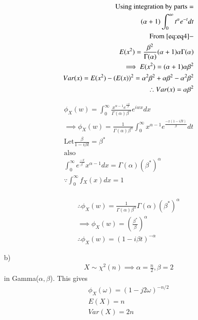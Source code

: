 \documentclass{beamer}
\begin{document}
 \begin{frame}
 \begin{align}
 \text{Using integration by parts}=\\
 (\alpha+1)\int_{0}^{\infty}t^{\alpha}e^{-t}dt\\
 \text{From \eqref{eq:eq4}}-\\
 E(x^2)=\frac{\beta^{2}}{\Gamma(\alpha)}(\alpha+1) \alpha \Gamma(\alpha)\\
 \implies E(x^2)=(\alpha+1) \alpha  \beta^{2}\\
 Var(x)= E(x^2)-(E(x))^2=\alpha^{2} \beta^{2}+\alpha\beta^{2}-\alpha^{2} \beta^{2}\\
 \therefore Var(x)=\alpha\beta^{2}
 \end{align}
 \end{frame}
 \begin{frame}
 \begin{align}
 \phi_{X}(w)=\int_{0}^{\infty} \frac{x^{\alpha-1}e^{\frac{-x}{\beta}}}{\Gamma(\alpha) \beta^{\alpha}} e^{iwx} dx \\
 \implies \phi_{X}(w)=\frac{1}{\Gamma(\alpha) \beta^{\alpha}} \int_{0}^{\infty}x^{\alpha-1} e^{\frac{-x(1-i\beta t)}{\beta}} dt\\
 \text{Let}\frac{\beta}{1-i \beta t}=\beta ^{*}\\
 \text{also} \\
 \int_{0}^{\infty} e^{\frac{-x}{\beta^{*}}} x^{\alpha-1} dx =\Gamma(\alpha)({\beta^{*}})^{\alpha}\\
 \because \int_{0}^{\infty}f_{X}(x)dx=1 \\
 \end{align}
 \end{frame}
 \begin{frame}
 \begin{align}
 \therefore \phi_{X}(w)=\frac{1}{\Gamma(\alpha) \beta^{\alpha}} \Gamma(\alpha)({\beta^{*}})^{\alpha}\\
 \implies \phi_{X}(w)=(\frac{\beta^{*}}{\beta})^{\alpha}\\
 \therefore \phi_{X}(w)=(1-i\beta t)^{-\alpha}
 \end{align}
 \end{frame}
\begin{frame}
    b)
    \begin{align}
        X \sim \chi ^2(n) \implies \alpha =\frac{n}{2}, \beta = 2
    \end{align}
    in Gamma($\alpha,\beta$). This gives
    \begin{align}
        \phi_X(\omega) = (1-j2\omega)^{-n/2}\\
        E(X) = n\\
        Var(X) = 2n
    \end{align}
\end{frame}
\end{document}
